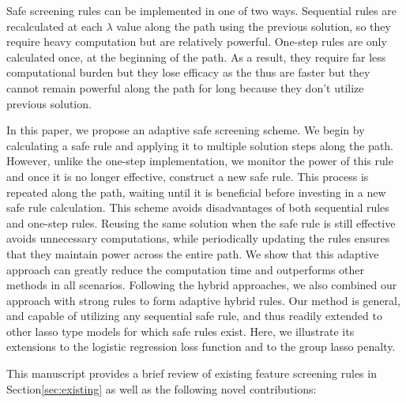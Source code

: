 Safe screening rules can be implemented in one of two ways. Sequential rules are recalculated at each $\lambda$ value along the path using the previous solution, so they require heavy computation but are relatively powerful. One-step rules are only calculated once, at the beginning of the path. As a result, they require far less computational burden but they lose efficacy as the thus are faster but they cannot remain powerful along the path for long because they don't utilize previous solution.

In this paper, we propose an adaptive safe screening scheme. We begin by calculating a safe rule and applying it to multiple solution steps along the path.  However, unlike the one-step implementation, we monitor the power of this rule and once it is no longer effective, construct a new safe rule.  This process is repeated along the path, waiting until it is beneficial before investing in a new safe rule calculation. This scheme avoids disadvantages of both sequential rules and one-step rules. Reusing the same solution when the safe rule is still effective avoids unnecessary computations, while periodically updating the rules ensures that they maintain power across the entire path. We show that this adaptive approach can greatly reduce the computation time and outperforms other methods in all scenarios. Following the hybrid approaches, we also combined our approach with strong rules to form adaptive hybrid rules. Our method is general, and capable of utilizing any sequential safe rule, and thus readily extended to other lasso type models for which safe rules exist. Here, we illustrate its extensions to the logistic regression loss function and to the group lasso penalty.

This manuscript provides a brief review of existing feature screening rules in Section\ref{sec:existing} as well as the following novel contributions:

